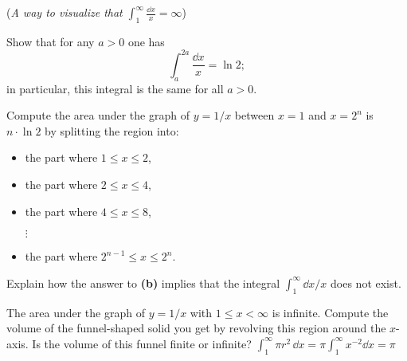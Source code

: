 \begin{multicols}{2}
\problem (\textit{A way to visualize that $\int_1^\infty \frac{\dd x} {x}=\infty$}) %

\subprob Show that for any $a>0$ one has
\[
\int_a^{2a} \frac{\dd x} {x} = \ln2;
\]
in particular, this integral is the same for all $a>0$.

\subprob Compute the area under the graph of $y=1/x$ between $x=1$ and $x=2^n$
is $n\cdot \ln 2$ by splitting the region into:
\begin{itemize}
\item the part where $1\leq x\leq 2$,
\item the part where $2\leq x\leq 4$,
\item the part where $4\leq x\leq 8$,
\item[$\vdots$]
\item the part where $2^{n-1}\leq x \leq 2^n$.
\end{itemize}
\subprob Explain how the answer to \textbf{(b)} implies that the integral
$\int_1^\infty \dd x/x$ does not exist.

\problem The area under the graph of $y=1/x$ with $1\leq x <\infty$ is infinite. %
Compute the volume of the funnel-shaped solid you get by revolving this region
around the $x$-axis.  Is the volume of this funnel finite or infinite?
\answer %
$\int_1^\infty \pi r^2\, \dd x = \pi \int_1^\infty x^{-2}\dd x = \pi$
\endanswer



\end{multicols}
\noproblemfont

